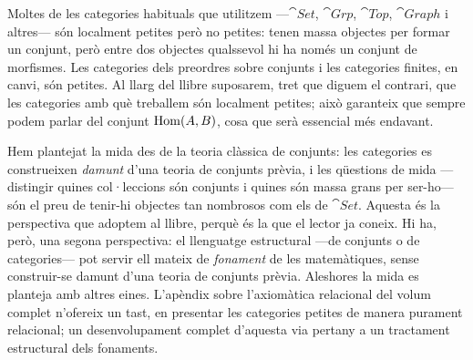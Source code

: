Moltes de les categories habituals que utilitzem ---$\cat{Set}$, $\cat{Grp}$, $\cat{Top}$, $\cat{Graph}$ i altres--- són localment petites però no petites: tenen massa objectes per formar un conjunt, però entre dos objectes qualssevol hi ha només un conjunt de morfismes. Les categories dels preordres sobre conjunts i les categories finites, en canvi, són petites. Al llarg del llibre suposarem, tret que diguem el contrari, que les categories amb què treballem són localment petites; això garanteix que sempre podem parlar del conjunt $\operatorname{Hom}(A,B)$, cosa que serà essencial més endavant.

\begin{observacio}
Hem plantejat la mida des de la teoria clàssica de conjunts: les categories es construeixen \emph{damunt} d'una teoria de conjunts prèvia, i les qüestions de mida ---distingir quines col·leccions són conjunts i quines són massa grans per ser-ho--- són el preu de tenir-hi objectes tan nombrosos com els de $\cat{Set}$. Aquesta és la perspectiva que adoptem al llibre, perquè és la que el lector ja coneix. Hi ha, però, una segona perspectiva: el llenguatge estructural ---de conjunts o de categories--- pot servir ell mateix de \emph{fonament} de les matemàtiques, sense construir-se damunt d'una teoria de conjunts prèvia. Aleshores la mida es planteja amb altres eines. L'apèndix sobre l’axiomàtica relacional del volum complet n'ofereix un tast, en presentar les categories petites de manera purament relacional; un desenvolupament complet d'aquesta via pertany a un tractament estructural dels fonaments.
\end{observacio}

